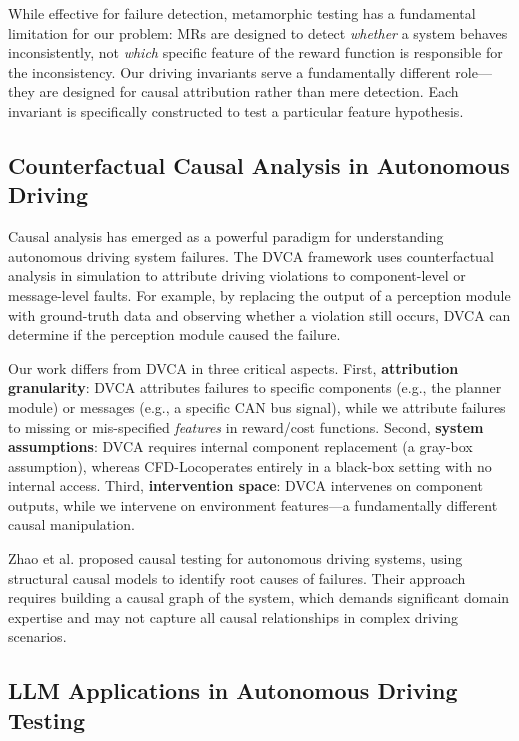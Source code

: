 \documentclass[conference]{IEEEtran}
\theoremstyle{plain}
\newcommand{\methodname}{CFD-Loc}
\begin{document}
While effective for failure detection, metamorphic testing has a fundamental limitation for our problem: MRs are designed to detect \emph{whether} a system behaves inconsistently, not \emph{which} specific feature of the reward function is responsible for the inconsistency. Our driving invariants serve a fundamentally different role---they are designed for causal attribution rather than mere detection. Each invariant is specifically constructed to test a particular feature hypothesis.

\subsection{Counterfactual Causal Analysis in Autonomous Driving}

Causal analysis has emerged as a powerful paradigm for understanding autonomous driving system failures. The DVCA framework \cite{wan2024dvca} uses counterfactual analysis in simulation to attribute driving violations to component-level or message-level faults. For example, by replacing the output of a perception module with ground-truth data and observing whether a violation still occurs, DVCA can determine if the perception module caused the failure.

Our work differs from DVCA in three critical aspects. First, \textbf{attribution granularity}: DVCA attributes failures to specific components (e.g., the planner module) or messages (e.g., a specific CAN bus signal), while we attribute failures to missing or mis-specified \emph{features} in reward/cost functions. Second, \textbf{system assumptions}: DVCA requires internal component replacement (a gray-box assumption), whereas \methodname operates entirely in a black-box setting with no internal access. Third, \textbf{intervention space}: DVCA intervenes on component outputs, while we intervene on environment features---a fundamentally different causal manipulation.

Zhao et al. \cite{zhao2023causal} proposed causal testing for autonomous driving systems, using structural causal models to identify root causes of failures. Their approach requires building a causal graph of the system, which demands significant domain expertise and may not capture all causal relationships in complex driving scenarios.

\subsection{LLM Applications in Autonomous Driving Testing}
\end{document}
